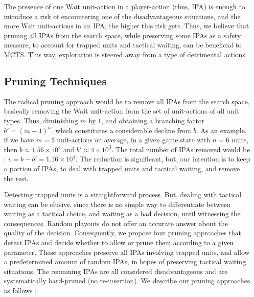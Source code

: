 \documentclass[conference]{IEEEtran}
\begin{document}
The presence of one Wait unit-action in a player-action (thus, IPA) is enough to introduce a risk of encountering one of the disadvantageous situations, and the more Wait unit-actions in an IPA, the higher this risk gets. Thus, we believe that pruning all IPAs from the search space, while preserving some IPAs as a safety measure, to account for trapped units and tactical waiting, can be beneficial to MCTS. This way, exploration is steered away from a type of detrimental actions.



\subsection{Pruning Techniques}

The radical pruning approach would be to remove all IPAs from the search space, basically removing the Wait unit-action from the set of unit-actions of all unit types. Thus, diminishing $m$ by $1$, and obtaining a branching factor $b' = (m - 1)^n$, which constitutes a considerable decline from $b$. As an example, if we have $m=5$ unit-actions on average, in a given game state with $n=6$ units, then $b \approx 1.56\times10^4$ and $b' \approx 4\times10^3$. The total number of IPAs removed would be : $v = b - b' = 1.16\times10^4$. The reduction is significant, but, our intention is to keep a portion of IPAs, to deal with trapped units and tactical waiting, and remove the rest.

Detecting trapped units is a straightforward process. But, dealing with tactical waiting can be elusive, since there is no simple way to differentiate between waiting as a tactical choice, and waiting as a bad decision, until witnessing the consequences. Random playouts do not offer an accurate answer about the quality of the decision. Consequently, we propose four pruning approaches that detect IPAs and decide whether to allow or prune them according to a given parameter. These approaches preserve all IPAs involving trapped units, and allow a predetermined amount of random IPAs, in hopes of preserving tactical waiting situations. The remaining IPAs are all considered disadvantageous and are systematically hard-pruned (no re-insertion). We describe our pruning approaches as follows :
\end{document}
